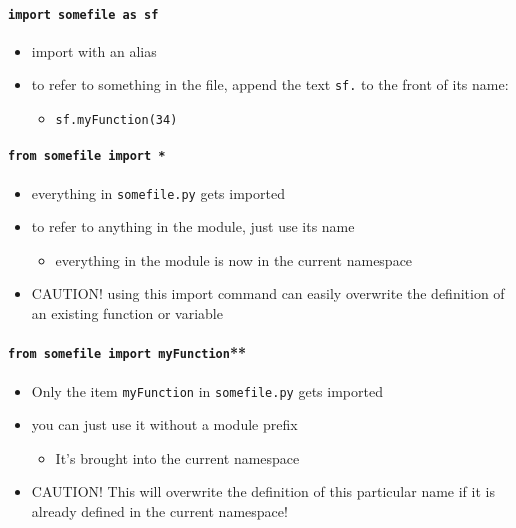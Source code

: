 \documentclass{article}
\begin{document}
    \paragraph{\texttt{import somefile as sf}}\label{import-somefile-as-sf}

\begin{itemize}
\item
  import with an alias
\item
  to refer to something in the file, append the text \texttt{sf.} to the
  front of its name:

  \begin{itemize}
  \itemsep1pt\parskip0pt
  \item
    \texttt{sf.myFunction(34)}
  \end{itemize}
\end{itemize}

    \paragraph{\texttt{from somefile import *}}\label{from-somefile-import}

\begin{itemize}
\item
  everything in \texttt{somefile.py} gets imported
\item
  to refer to anything in the module, just use its name

  \begin{itemize}
  \itemsep1pt\parskip0pt
  \item
    everything in the module is now in the current namespace
  \end{itemize}
\item
  CAUTION! using this import command can easily overwrite the definition
  of an existing function or variable
\end{itemize}

    \paragraph{\texttt{from somefile import myFunction}**}\label{from-somefile-import-myfunction}

\begin{itemize}
\item
  Only the item \texttt{myFunction} in \texttt{somefile.py} gets
  imported
\item
  you can just use it without a module prefix

  \begin{itemize}
  \itemsep1pt\parskip0pt
  \item
    It's brought into the current namespace
  \end{itemize}
\item
  CAUTION! This will overwrite the definition of this particular name if
  it is already defined in the current namespace!
\end{itemize}
\end{document}
